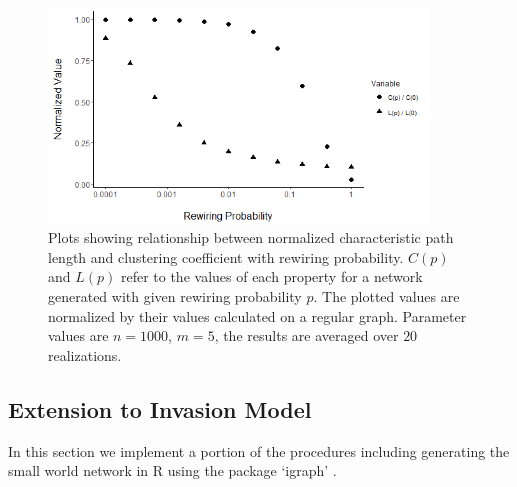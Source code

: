 \documentclass[12pt, openany]{book}
\theoremstyle{definition}
\theoremstyle{remark}
\numberwithin{equation}{chapter}
\numberwithin{figure}{chapter}
\begin{document}
\begin{figure}[t!]
\begin{center}
       \includegraphics[width=0.9\textwidth]{paths.png}
       \caption{Plots showing relationship between normalized characteristic path length and clustering coefficient with rewiring probability. $C(p)$ and $L(p)$ refer to the values of each property for a network generated with given rewiring probability $p$. The plotted values are normalized by their values calculated on a regular graph. Parameter values are $n = 1000$, $m = 5$, the results are averaged over $20$ realizations.\label{pathlength_igraph}}
\end{center}
\end{figure}  

\subsection{Extension to Invasion Model}

In this section we implement a portion of the procedures including generating the small world network in R using the package `igraph' \citep{csardi2006igraph}.
\end{document}
